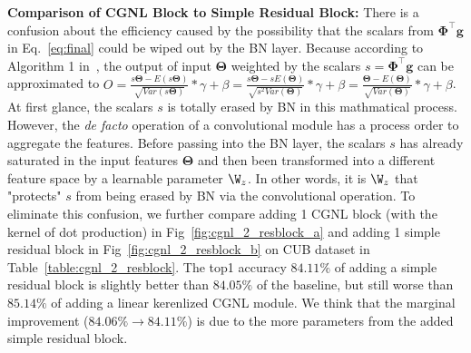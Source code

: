 \documentclass{article}
\begin{document}
\textbf{Comparison of CGNL Block to Simple Residual Block:}
There is a confusion about the efficiency caused by the possibility that the scalars from $\bm{\Phi}^\top \bm{g}$ in Eq.~\ref{eq:final} could be wiped out by the BN layer.
Because according to Algorithm 1 in~\cite{bn}, the output of input $\bm{\Theta}$ weighted by the scalars $s=\bm{\Phi}^\top \bm{g}$ can be approximated to
$O=\frac{s\bm{\Theta}-E(s\bm{\Theta})}{\sqrt{Var(s\bm{\Theta})}} * \gamma + \beta
  =\frac{s\bm{\Theta}-sE(\bm{\Theta})}{\sqrt{s^2Var(\bm{\Theta})}} * \gamma + \beta
  =\frac{\bm{\Theta}-E(\bm{\Theta})}{\sqrt{Var(\bm{\Theta})}} * \gamma + \beta$.
At first glance, the scalars $s$ is totally erased by BN in this mathmatical process.
However, the \emph{de facto} operation of a convolutional module has a process order to aggregate the features.
Before passing into the BN layer, the scalars $s$ has already saturated in the input features $\bm{\Theta}$ and then been transformed into a different feature space by a learnable parameter $\W_z$.
In other words, it is $\W_z$ that "protects" $s$ from being erased by BN via the convolutional operation.
To eliminate this confusion, we further compare adding 1 CGNL block (with the kernel of dot production) in Fig~\ref{fig:cgnl_2_resblock_a} and adding 1 simple residual block in Fig~\ref{fig:cgnl_2_resblock_b} on CUB dataset in Table~\ref{table:cgnl_2_resblock}.
The top1 accuracy $84.11\%$ of adding a simple residual block is slightly better than $84.05\%$ of the baseline, but still worse than $85.14\%$ of adding a linear kerenlized CGNL module.
We think that the marginal improvement ($84.06\%\rightarrow84.11\%$) is due to the more parameters from the added simple residual block.
\end{document}
